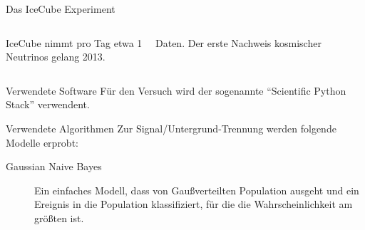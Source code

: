 \documentclass[t]{beamer}
\begin{document}
\begin{columns}[onlytextwidth]
\begin{column}{0.5\textwidth}
\begin{block}{Das IceCube Experiment}
\begin{columns}[onlytextwidth]
\begin{column}{0.48\textwidth}
            IceCube nimmt pro Tag etwa \SI{1}{\tera\byte} Daten. 
            Der erste Nachweis kosmischer Neutrinos gelang 2013.
          \end{column}%
        \end{columns}%
      \end{block}%
      \begin{block}{Verwendete Software}%
        Für den Versuch wird der sogenannte \enquote{Scientific Python Stack} verwendent.\par
      \end{block}
      \begin{block}{Verwendete Algorithmen}
        Zur Signal/Untergrund-Trennung werden folgende Modelle erprobt:
        \begin{description}
          \item[Gaussian Naive Bayes] Ein einfaches Modell, dass von Gaußverteilten
            Population ausgeht und ein Ereignis in die Population klassifiziert, für
            die die Wahrscheinlichkeit am größten ist.

\end{description}
\end{block}
\end{column}
\end{columns}
\end{document}
